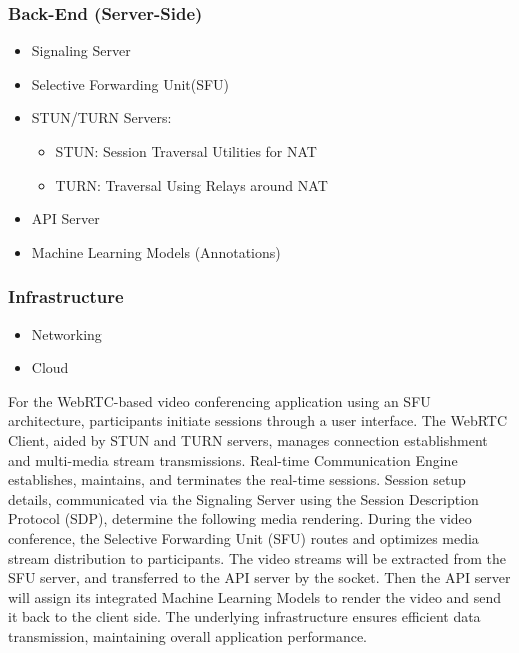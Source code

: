 \documentclass[12pt]{article}
\begin{document}
\subsubsection{Back-End (Server-Side)}
\begin{itemize}
    \item Signaling Server
    \item Selective Forwarding Unit(SFU)
    \item STUN/TURN Servers:
        \begin{itemize}
            \item STUN: Session Traversal Utilities for NAT
            \item TURN: Traversal Using Relays around NAT
        \end{itemize}
    \item API Server
    \item Machine Learning Models (Annotations)
\end{itemize}
\subsubsection{Infrastructure}
\begin{itemize}
    \item Networking
    \item Cloud
\end{itemize}
For the WebRTC-based video conferencing application using an SFU architecture, participants initiate sessions through a user interface. The WebRTC Client, aided by STUN and TURN servers, manages connection establishment and multi-media stream transmissions. Real-time Communication Engine establishes, maintains, and terminates the real-time sessions. Session setup details, communicated via the Signaling Server using the Session Description Protocol (SDP), determine the following media rendering. During the video conference, the Selective Forwarding Unit (SFU) routes and optimizes media stream distribution to participants. The video streams will be extracted from the SFU server,  and transferred to the API server by the socket. Then the API server will assign its integrated Machine Learning Models to render the video and send it back to the client side. The underlying infrastructure ensures efficient data transmission, maintaining overall application performance.
\end{document}
